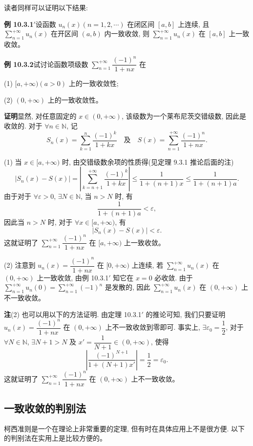 \documentclass[UTF8, 12pt, fontset=fandol, oneside]{ctexart}
\begin{document}
读者同样可以证明以下结果:

\noindent\textbf{例 10.3.1$'$}\quad 设函数 $u_n(x)(n=1,2,\cdots)$ 在闭区间 $[a,b]$ 上连续, 且 $\sum\limits_{n=1}^{+\infty}u_n(x)$ 在开区间 $(a,b)$ 内一致收敛, 则 $\sum\limits_{n=1}^{+\infty}u_n(x)$ 在 $[a,b]$ 上一致收敛。

\noindent\textbf{例 10.3.2}\quad 试讨论函数项级数 $\sum\limits_{n=1}^{+\infty}\dfrac{(-1)^n}{1+nx}$ 在

(1) $[a,+\infty)(a>0)$ 上的一致收敛性;

(2) $(0,+\infty)$ 上的一致收敛性。

\noindent\textbf{证明}\quad 显然, 对任意固定的 $x\in(0,+\infty)$, 该级数为一个莱布尼茨交错级数, 因此是收敛的. 对于 $\forall n\in\mathbb N$, 记
\[
  S_n(x)=\sum_{k=1}^n\frac{(-1)^k}{1+kx}\quad\text{及}\quad S(x)=\sum_{n=1}^{+\infty}\frac{(-1)^n}{1+nx}.
\]

(1) 当 $x\in[a,+\infty)$ 时, 由交错级数余项的性质得(见定理 9.3.1 推论后面的注)
\[
  |S_n(x)-S(x)|=\left|\sum_{k=n+1}^{+\infty}\frac{(-1)^k}{1+kx}\right|\leq\frac1{1+(n+1)x}\leq\frac1{1+(n+1)a}.
\]
由于对于 $\forall\varepsilon>0$, $\exists N\in\mathbb N$, 当 $n>N$ 时, 有
\[
  \frac1{1+(n+1)a}<\varepsilon,
\]
因此当 $n>N$ 时, 对于 $\forall x\in[a,+\infty)$, 有
\[
  |S_n(x)-S(x)|<\varepsilon.
\]
这就证明了 $\sum\limits_{n=1}^{+\infty}\dfrac{(-1)^n}{1+nx}$ 在 $[a,+\infty)$ 上一致收敛。

(2) 注意到 $u_n(x)=\dfrac{(-1)^n}{1+nx}$ 在 $[0,+\infty)$ 上连续, 若 $\sum\limits_{n=1}^{+\infty}u_n(x)$ 在 $(0,+\infty)$ 上一致收敛, 由例 10.3.1$'$ 知它在 $x=0$ 必收敛. 由于 $\sum\limits_{n=1}^{+\infty}u_n(0)=\sum\limits_{n=1}^{+\infty}(-1)^n$ 是发散的, 因此 $\sum\limits_{n=1}^{+\infty}u_n(x)$ 在 $(0,+\infty)$ 上不一致收敛。

\noindent\textbf{注}\quad (2) 也可以用以下的方法证明. 由定理 10.3.1$'$ 的推论可知, 我们只要证明 $u_n(x)=\dfrac{(-1)^n}{1+nx}$ 在 $(0,+\infty)$ 上不一致收敛到零即可. 事实上, $\exists\varepsilon_0=\dfrac12$, 对于 $\forall N\in\mathbb N$, $\exists N+1>N$ 及 $x'=\dfrac1{N+1}\in(0,+\infty)$, 使得
\[
  \left|\frac{(-1)^{N+1}}{1+(N+1)x'}\right|=\frac12=\varepsilon_0.
\]
这就证明了 $\sum\limits_{n=1}^{+\infty}\dfrac{(-1)^n}{1+nx}$ 在 $(0,+\infty)$ 上不一致收敛。

\subsection{一致收敛的判别法}

柯西准则是一个在理论上非常重要的定理, 但有时在具体应用上不是很方便. 以下的判别法在实用上是比较方便的。
\end{document}
